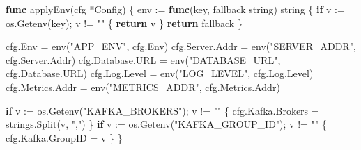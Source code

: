 \documentclass[
]{article}
\newenvironment{Shaded}{}{}
\newcommand{\ControlFlowTok}[1]{\textcolor[rgb]{0.00,0.44,0.13}{\textbf{#1}}}
\newcommand{\DataTypeTok}[1]{\textcolor[rgb]{0.56,0.13,0.00}{#1}}
\newcommand{\KeywordTok}[1]{\textcolor[rgb]{0.00,0.44,0.13}{\textbf{#1}}}
\newcommand{\NormalTok}[1]{#1}
\newcommand{\OperatorTok}[1]{\textcolor[rgb]{0.40,0.40,0.40}{#1}}
\newcommand{\StringTok}[1]{\textcolor[rgb]{0.25,0.44,0.63}{#1}}
\begin{document}
\begin{Shaded}
\begin{Highlighting}[]
\KeywordTok{func}\NormalTok{ applyEnv}\OperatorTok{(}\NormalTok{cfg }\OperatorTok{*}\NormalTok{Config}\OperatorTok{)} \OperatorTok{\{}
\NormalTok{    env }\OperatorTok{:=} \KeywordTok{func}\OperatorTok{(}\NormalTok{key}\OperatorTok{,}\NormalTok{ fallback }\DataTypeTok{string}\OperatorTok{)} \DataTypeTok{string} \OperatorTok{\{}
        \ControlFlowTok{if}\NormalTok{ v }\OperatorTok{:=}\NormalTok{ os}\OperatorTok{.}\NormalTok{Getenv}\OperatorTok{(}\NormalTok{key}\OperatorTok{);}\NormalTok{ v }\OperatorTok{!=} \StringTok{""} \OperatorTok{\{}
            \ControlFlowTok{return}\NormalTok{ v}
        \OperatorTok{\}}
        \ControlFlowTok{return}\NormalTok{ fallback}
    \OperatorTok{\}}

\NormalTok{    cfg}\OperatorTok{.}\NormalTok{Env                    }\OperatorTok{=}\NormalTok{ env}\OperatorTok{(}\StringTok{"APP\_ENV"}\OperatorTok{,}\NormalTok{ cfg}\OperatorTok{.}\NormalTok{Env}\OperatorTok{)}
\NormalTok{    cfg}\OperatorTok{.}\NormalTok{Server}\OperatorTok{.}\NormalTok{Addr            }\OperatorTok{=}\NormalTok{ env}\OperatorTok{(}\StringTok{"SERVER\_ADDR"}\OperatorTok{,}\NormalTok{ cfg}\OperatorTok{.}\NormalTok{Server}\OperatorTok{.}\NormalTok{Addr}\OperatorTok{)}
\NormalTok{    cfg}\OperatorTok{.}\NormalTok{Database}\OperatorTok{.}\NormalTok{URL           }\OperatorTok{=}\NormalTok{ env}\OperatorTok{(}\StringTok{"DATABASE\_URL"}\OperatorTok{,}\NormalTok{ cfg}\OperatorTok{.}\NormalTok{Database}\OperatorTok{.}\NormalTok{URL}\OperatorTok{)}
\NormalTok{    cfg}\OperatorTok{.}\NormalTok{Log}\OperatorTok{.}\NormalTok{Level              }\OperatorTok{=}\NormalTok{ env}\OperatorTok{(}\StringTok{"LOG\_LEVEL"}\OperatorTok{,}\NormalTok{ cfg}\OperatorTok{.}\NormalTok{Log}\OperatorTok{.}\NormalTok{Level}\OperatorTok{)}
\NormalTok{    cfg}\OperatorTok{.}\NormalTok{Metrics}\OperatorTok{.}\NormalTok{Addr           }\OperatorTok{=}\NormalTok{ env}\OperatorTok{(}\StringTok{"METRICS\_ADDR"}\OperatorTok{,}\NormalTok{ cfg}\OperatorTok{.}\NormalTok{Metrics}\OperatorTok{.}\NormalTok{Addr}\OperatorTok{)}

    \ControlFlowTok{if}\NormalTok{ v }\OperatorTok{:=}\NormalTok{ os}\OperatorTok{.}\NormalTok{Getenv}\OperatorTok{(}\StringTok{"KAFKA\_BROKERS"}\OperatorTok{);}\NormalTok{ v }\OperatorTok{!=} \StringTok{""} \OperatorTok{\{}
\NormalTok{        cfg}\OperatorTok{.}\NormalTok{Kafka}\OperatorTok{.}\NormalTok{Brokers }\OperatorTok{=}\NormalTok{ strings}\OperatorTok{.}\NormalTok{Split}\OperatorTok{(}\NormalTok{v}\OperatorTok{,} \StringTok{","}\OperatorTok{)}
    \OperatorTok{\}}
    \ControlFlowTok{if}\NormalTok{ v }\OperatorTok{:=}\NormalTok{ os}\OperatorTok{.}\NormalTok{Getenv}\OperatorTok{(}\StringTok{"KAFKA\_GROUP\_ID"}\OperatorTok{);}\NormalTok{ v }\OperatorTok{!=} \StringTok{""} \OperatorTok{\{}
\NormalTok{        cfg}\OperatorTok{.}\NormalTok{Kafka}\OperatorTok{.}\NormalTok{GroupID }\OperatorTok{=}\NormalTok{ v}
    \OperatorTok{\}}
\OperatorTok{\}}


\end{Highlighting}
\end{Shaded}
\end{document}
